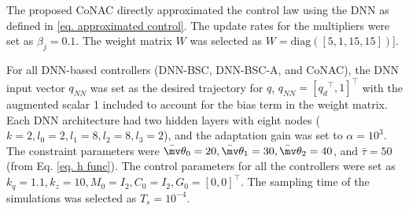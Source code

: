 \documentclass[lettersize,journal]{IEEEtran}
\newcommand*{\wth}{\mv\theta}
\begin{document}
The proposed CoNAC directly approximated the control law using the DNN as defined in \eqref{eq. approximated control}. The update rates for the multipliers were set as $\beta_{j}=0.1$. The weight matrix $W$ was selected as $W=\text{diag}([5,1,15,15])]$.

For all DNN-based controllers (DNN-BSC, DNN-BSC-A, and CoNAC), the DNN input vector $q_{NN}$ was set as the desired trajectory for ${q}$, \ie $q_{NN}=[{q_d}^\top,1]^\top$ with the augmented scalar 1 included to account for the bias term in the weight matrix. 
Each DNN architecture had two hidden layers with eight nodes (\ie $k=2, l_0=2, l_1=8, l_2=8, l_3=2$), and the adaptation gain was set to $\alpha =10^3$. The constraint parameters were $\bar\wth_0=20, \bar\wth_1=30, \bar\wth_2=40$, and $\bar\tau = 50$ (from Eq. \eqref{eq. h func}). The control parameters for all the controllers were set as ${k_q}=1.1,{k_z}=10,M_0=I_2,C_0=I_2,G_0=[0,0]^\top$.
The sampling time of the simulations was selected as $T_s=10^{-4}$.
\end{document}
